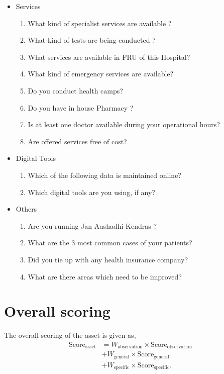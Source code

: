 \documentclass[oneside]{article}
\newcommand{\tsub}[2]{\text{#1}_{\text{#2}}}
\newcommand{\tsubb}[2]{#1_{\text{#2}}}
\begin{document}
\begin{itemize}
\begin{itemize}
\item Services
\begin{enumerate}
\item  What kind of specialist services are available ?
\item  What kind of tests are being conducted ?
\item  What services are available in FRU of this Hospital?
\item  What kind of emergency services are available?
\item  Do you conduct health camps?
\item  Do you have in house Pharmacy ?
\item  Is at least one doctor available during your operational hours?
\item  Are offered services free of cost?
\end{enumerate}

\item Digital Tools
\begin{enumerate}
\item  Which of the following data is maintained online?
\item  Which digital tools are you using, if any?
\end{enumerate}

\item Others
\begin{enumerate}
\item  Are you running Jan Aushadhi Kendras ?
\item  What are the 3 most common cases of your patients?
\item  Did you tie up with any health insurance company?
\item  What are there areas which need to be improved?
\end{enumerate}

\end{itemize}

    \end{itemize}
\section{Overall scoring}
The overall scoring of the asset is given as,
\begin{align*}
	\tsub{Score}{asset} &= \tsubb{W}{observation} \times \tsub{Score}{observation} \\
	&+ \tsubb{W}{general} \times \tsub{Score}{general} \\
	&+ \tsubb{W}{specific} \times \tsub{Score}{specific}.
\end{align*}
\end{document}
